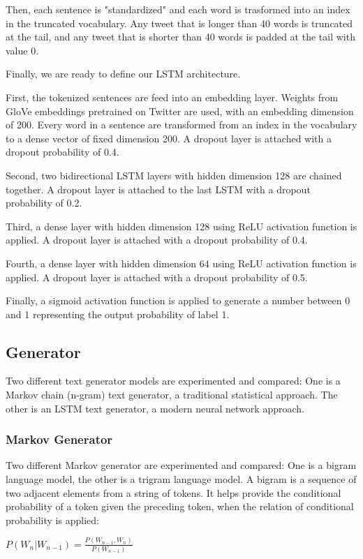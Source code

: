 \documentclass{article}
\begin{document}
Then, each sentence is "standardized" and each word is trasformed into an index in the truncated vocabulary. Any tweet that is longer than 40 words is truncated at the tail, and any tweet that is shorter than 40 words is padded at the tail with value 0.

Finally, we are ready to define our LSTM architecture.  

First, the tokenized sentences are feed into an embedding layer. Weights from GloVe embeddings pretrained on Twitter are used, with an embedding dimension of 200. Every word in a sentence are transformed from an index in the vocabulary to a dense vector of fixed dimension 200. A dropout layer is attached with a dropout probability of 0.4.

Second, two bidirectional LSTM layers with hidden dimension 128 are chained together. A dropout layer is attached to the last LSTM with a dropout probability of 0.2.

Third, a dense layer with hidden dimension 128 using ReLU activation function is applied. A dropout layer is attached with a dropout probability of 0.4.

Fourth, a dense layer with hidden dimension 64 using ReLU activation function is applied. A dropout layer is attached with a dropout probability of 0.5.

Finally, a sigmoid activation function is applied to generate a number between 0 and 1 representing the output probability of label 1.

\subsection{Generator}
Two different text generator models are experimented and compared: One is a Markov chain (n-gram) text generator, a traditional statistical approach. The other is an LSTM text generator, a modern neural network approach.
\subsubsection{Markov Generator}
Two different Markov generator are experimented and compared: One is a bigram language model, the other is a trigram language model.
A bigram is a sequence of two adjacent elements from a string of tokens. It helps provide the conditional probability of a token given the preceding token, when the relation of conditional probability is applied:

$P(W_n | W_{n-1}) = \frac{P(W_{n-1}, W_n)}{P(W_{n-1})}$
\end{document}
